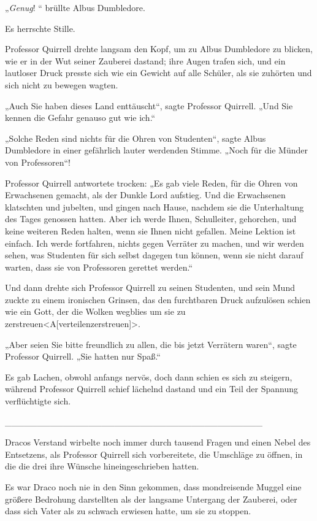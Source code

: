 {„\emph{Genug}! “ brüllte Albus Dumbledore.

Es herrschte Stille.

Professor Quirrell drehte langsam den Kopf, um zu Albus Dumbledore zu blicken, wie er in der Wut seiner Zauberei dastand; ihre Augen trafen sich, und ein lautloser Druck presste sich wie ein Gewicht auf alle Schüler, als sie zuhörten und sich nicht zu bewegen wagten.

„Auch Sie haben dieses Land enttäuscht“, sagte Professor Quirrell. „Und Sie kennen die Gefahr genauso gut wie ich.“

„Solche Reden sind nichts für die Ohren von Studenten“, sagte Albus Dumbledore in einer gefährlich lauter werdenden Stimme. „Noch für die Münder von Professoren“!

Professor Quirrell antwortete trocken: „Es gab viele Reden, für die Ohren von Erwachsenen gemacht, als der Dunkle Lord aufstieg. Und die Erwachsenen klatschten und jubelten, und gingen nach Hause, nachdem sie die Unterhaltung des Tages genossen hatten. Aber ich werde Ihnen, Schulleiter, gehorchen, und keine weiteren Reden halten, wenn sie Ihnen nicht gefallen. Meine Lektion ist einfach. Ich werde fortfahren, nichts gegen Verräter zu machen, und wir werden sehen, was Studenten für sich selbst dagegen tun können, wenn sie nicht darauf warten, dass sie von Professoren gerettet werden.“

Und dann drehte sich Professor Quirrell zu seinen Studenten, und sein Mund zuckte zu einem ironischen Grinsen, das den furchtbaren Druck aufzulösen schien wie ein Gott, der die Wolken wegblies um sie zu zerstreuen\textless A{[}verteilen\textbar zerstreuen{]}\textgreater.

„Aber seien Sie bitte freundlich zu allen, die bis jetzt Verrätern waren“, sagte Professor Quirrell. „Sie hatten nur Spaß.“

Es gab Lachen, obwohl anfangs nervös, doch dann schien es sich zu steigern, während Professor Quirrell schief lächelnd dastand und ein Teil der Spannung verflüchtigte sich.

\_\_\_\_\_\_\_\_\_\_\_\_\_\_\_\_\_\_\_\_\_\_\_\_\_\_\_\_\_\_\_\_\_\_\_\_\_\_\_\_

Dracos Verstand wirbelte noch immer durch tausend Fragen und einen Nebel des Entsetzens, als Professor Quirrell sich vorbereitete, die Umschläge zu öffnen, in die die drei ihre Wünsche hineingeschrieben hatten.

Es war Draco noch nie in den Sinn gekommen, dass mondreisende Muggel eine größere Bedrohung darstellten als der langsame Untergang der Zauberei, oder dass sich Vater als zu schwach erwiesen hatte, um sie zu stoppen.

}
